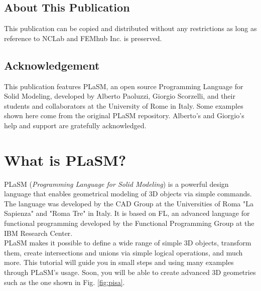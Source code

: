 \documentclass[article,A4,12pt]{llncs}
\begin{document}
\subsection*{About This Publication}
This publication can be copied and distributed without any restrictions
as long as reference to NCLab and FEMhub Inc. is preserved.

\subsection*{Acknowledgement}
This publication features PLaSM, an open source Programming Language for 
Solid Modeling, developed by Alberto Paoluzzi, Giorgio Scorzelli, and their 
students and collaborators at the University of Rome in Italy. Some examples 
shown here come from the original PLaSM repository. Alberto's 
and Giorgio's help and support are gratefully acknowledged. 

\normalsize

\newpage
\setcounter{tocdepth}{2}
\tableofcontents

\newpage

\pagestyle{plain}
\setcounter{page}{1}


\section{What is PLaSM?}

PLaSM ({\em Programming Language for Solid Modeling}) is a powerful design language
that enables geometrical modeling of 3D objects via simple commands.
The language was developed by the CAD Group at the Universities of Roma 
"La Sapienza" and "Roma Tre" in Italy. It is based on FL, an advanced 
language for functional programming developed by the Functional 
Programming Group at the IBM Research Center.\\

\noindent
PLaSM makes it possible to define a wide range of simple 3D objects, transform 
them, create intersections and unions via simple logical operations, and much 
more. This tutorial will guide you in small steps and using many examples
through PLaSM's usage. Soon, you will be able to create advanced 
3D geometries such as the one shown in Fig. \ref{fig:pisa}.
\end{document}
